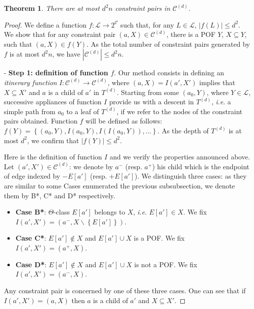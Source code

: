 \documentclass{article}
\newtheorem{theorem}{Theorem}
\newcommand{\set}[1]{\left\{ #1 \right\}}
\newcommand{\card}[1]{\left| #1 \right|}
\begin{document}
\begin{theorem}
There are at most $d^2n$ constraint pairs in $\mathcal{C}^{(d)}$.
\label{th:cardinality_c}
\end{theorem}
\begin{proof}
We define a function $f : \mathcal{L} \rightarrow 2^{\mathcal{C}}$ such that, for any $L \in \mathcal{L}$, $\card{f(L)} \le d^2$. We show that for any constraint pair $(a,X) \in \mathcal{C}^{(d)}$, there is a POF $Y$, $X \subseteq Y$, such that $(a,X) \in f(Y)$. As the total number of constraint pairs generated by $f$ is at most $d^2n$, we have $\card{\mathcal{C}^{(d)}} \le d^2n$.

- \textbf{Step 1: definition of function $f$}. Our method consists in defining an \textit{itinerary function} $I : \mathcal{C}^{(d)} \rightarrow \mathcal{C}^{(d)}$, where $(a,X) = I(a',X')$ implies that $X \subseteq X'$ and $a$ is a child of $a'$ in $T^{(d)}$. Starting from some $(a_0,Y)$, where $Y \in \mathcal{L}$, successive appliances of function $I$ provide us with a descent in $T^{(d)}$, {\em i.e.} a simple path from $a_0$ to a leaf of $T^{(d)}$, if we refer to the nodes of the constraint pairs obtained. Function $f$ will be defined as follows: $f(Y) = \set{(a_0,Y),I(a_0,Y),I(I(a_0,Y)),\ldots}$. As the depth of $T^{(d)}$ is at most $d^2$, we confirm that $\card{f(Y)}\le d^2$.

Here is the definition of function $I$ and we verify the properties announced above. Let $(a',X') \in \mathcal{C}^{(d)}$: we denote by $a^-$ (resp. $a^+$) his child which is the endpoint of edge indexed by $-E\left[a'\right]$ (resp. $+E\left[a'\right]$). We distinguish three cases: as they are similar to some Cases enumerated the previous subsubsection, we denote them by B*, C* and D* respectively.
\begin{itemize}
\item \textbf{Case B*}: $\Theta$-class $E\left[a'\right]$ belongs to $X$, {\em i.e.} $E\left[a'\right] \in X$. We fix $I(a',X') = (a^-,X\backslash \set{E\left[a'\right]})$.
\item \textbf{Case C*}: $E\left[a'\right] \notin X$ and $E\left[a'\right] \cup X$ is a POF. We fix $I(a',X') = (a^+,X)$.
\item \textbf{Case D*}: $E\left[a'\right] \notin X$ and $E\left[a'\right] \cup X$ is not a POF. We fix $I(a',X') = (a^-,X)$.
\end{itemize}
Any constraint pair is concerned by one of these three cases. One can see that if $I(a',X') = (a,X)$ then $a$ is a child of $a'$ and $X \subseteq X'$.


\end{proof}
\end{document}
